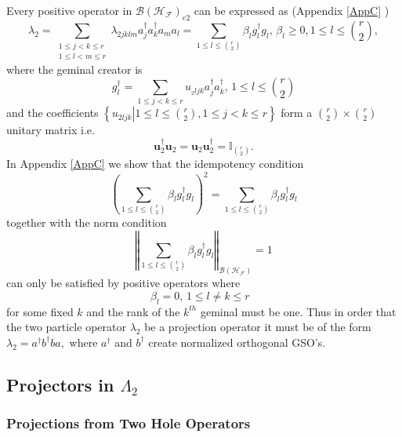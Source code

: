 \documentclass[aps,preprint]{revtex4}%
\begin{document}
Every positive operator in $\mathcal{B}\left(  \mathcal{H}_{\mathcal{F}%
}\right)  _{e2}$ can be expressed as (Appendix \ref{AppC} )
\begin{equation}
\lambda_{2}=\sum_{\substack{1\leq j<k\leq r\\1\leq l<m\leq r}}\lambda
_{2jklm}a_{j}^{\dagger}a_{k}^{\dagger}a_{m}a_{l}=\sum_{1\leq l\leq\binom{r}%
{2}}\beta_{l}g_{l}^{\dagger}g_{l},\,\beta_{l}\geq0,1\leq l\leq\binom{r}{2},
\end{equation}
where the geminal creator is
\begin{equation}
g_{l}^{\dagger}=\sum_{1\leq j<k\leq r}u_{_{2}ljk}a_{j}^{\dagger}a_{k}%
^{\dagger},\,1\leq l\leq\binom{r}{2}%
\end{equation}
and the coefficients $\left\{  \left.  u_{2ljk}\right\vert 1\leq l\leq
\binom{r}{2},1\leq j<k\leq r\right\}  $ form a $\binom{r}{2}\times\binom{r}%
{2}$ unitary matrix i.e.
\begin{equation}
\mathbf{u}_{2}^{\dagger}\mathbf{u}_{2}=\mathbf{u}_{2}\mathbf{u}_{2}^{\dagger
}=\mathbb{I}_{\binom{r}{2}}.
\end{equation}
In Appendix \ref{AppC} we show that the idempotency condition
\begin{equation}
\left(  \sum_{1\leq l\leq\binom{r}{2}}\beta_{l}g_{l}^{\dagger}g_{l}\right)
^{2}=\sum_{1\leq l\leq\binom{r}{2}}\beta_{l}g_{l}^{\dagger}g_{l}%
\end{equation}
together with the norm condition
\begin{equation}
\left\Vert \sum_{1\leq l\leq\binom{r}{2}}\beta_{l}g_{l}^{\dagger}%
g_{l}\right\Vert _{\mathcal{B}\left(  \mathcal{H}_{\mathcal{F}}\right)  }=1
\end{equation}
can only be satisfied by positive operators where
\begin{equation}
\beta_{l}=0,\,1\leq l\neq k\leq r\text{ }%
\end{equation}
for some fixed $k$ and the rank of the $k^{th}$ geminal must be one. Thus in
order that the two particle operator $\lambda_{2}$ be a projection operator it
must be of the form $\lambda_{2}=a^{\dagger}b^{\dagger}ba,$ where $a^{\dagger
}$ and $b^{\dagger}$ create normalized orthogonal GSO's.

\subsection{Projectors in $\Lambda_{2}$ \label{Proj1&2}}

\subsubsection{Projections from Two Hole Operators}
\end{document}
